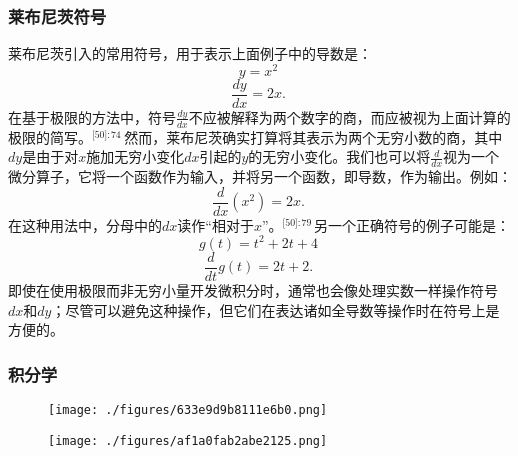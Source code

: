 \subsubsection{莱布尼茨符号} 
莱布尼茨引入的常用符号，用于表示上面例子中的导数是：
\[
y = x^2 ~
\]
\[\frac{dy}{dx} = 2x.~
\]
在基于极限的方法中，符号\(\frac{dy}{dx}\)不应被解释为两个数字的商，而应被视为上面计算的极限的简写。\(^\text{[50]: 74 }\)  然而，莱布尼茨确实打算将其表示为两个无穷小数的商，其中\(dy\)是由于对\(x\)施加无穷小变化\(dx\)引起的\(y\)的无穷小变化。我们也可以将\(\frac{d}{dx}\)视为一个微分算子，它将一个函数作为输入，并将另一个函数，即导数，作为输出。例如：
\[
\frac{d}{dx}(x^2) = 2x.~
\]
在这种用法中，分母中的\(dx\)读作“相对于\(x\)”。\(^\text{[50]: 79 }\) 另一个正确符号的例子可能是：
\[
g(t) = t^2 + 2t + 4~
\]
\[
\frac{d}{dt} g(t) = 2t + 2.~
\]
即使在使用极限而非无穷小量开发微积分时，通常也会像处理实数一样操作符号\(dx\)和\(dy\)；尽管可以避免这种操作，但它们在表达诸如全导数等操作时在符号上是方便的。
\subsubsection{积分学}
\begin{figure}[ht]
\centering
\texttt{[image: ./figures/633e9d9b8111e6b0.png]}
\caption{} \label{fig_Calcul_9}
\end{figure}
\begin{figure}[ht]
\centering
\texttt{[image: ./figures/af1a0fab2abe2125.png]}
\caption{} \label{fig_Calcul_10}
\end{figure}